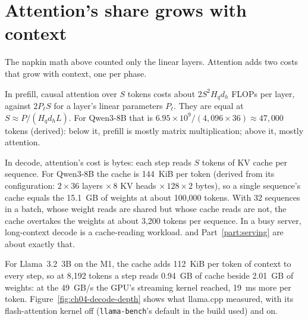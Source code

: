 \section{Attention's share grows with context}

The napkin math above counted only the linear layers. Attention adds two costs
that grow with context, one per phase.

In prefill, causal attention over $S$ tokens costs about $2S^{2}H_qd_h$ FLOPs
per layer, against $2P_{\ell}S$ for a layer's linear parameters $P_{\ell}$.
They are equal at $S\approx P/(H_qd_hL)$. For Qwen3-8B that is
$6.95\times10^{9}/(4{,}096\times36)\approx 47{,}000$ tokens (derived): below
it, prefill is mostly matrix multiplication; above it, mostly attention.

In decode, attention's cost is bytes: each step reads $S$ tokens of KV cache
per sequence. For Qwen3-8B the cache is 144~KiB per token (derived from its
configuration: $2\times36$ layers $\times\,8$ KV heads $\times\,128\times2$
bytes), so a single sequence's cache equals the 15.1~GB of weights at about
100,000 tokens. With 32 sequences in a batch, whose weight reads are shared
but whose cache reads are not, the cache overtakes the weights at about 3,200
tokens per sequence. In a busy server, long-context decode is a
cache-reading workload.  and Part~\ref{part:serving} are about
exactly that.

For Llama~3.2~3B on the M1, the cache adds 112~KiB per token of context to
every step, so at 8,192 tokens a step reads 0.94~GB of cache beside 2.01~GB of
weights: at the 49~GB/s the GPU's streaming kernel reached, 19~ms more per
token. Figure~\ref{fig:ch04-decode-depth} shows what llama.cpp measured, with
its flash-attention kernel off (\texttt{llama-bench}'s default in the build
used) and on.


